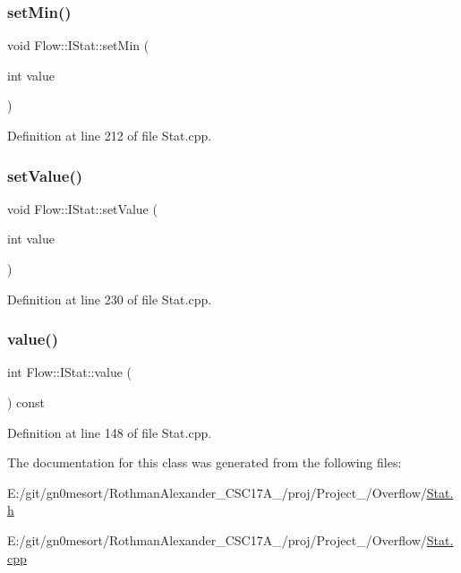 \hypertarget{class_flow_1_1_i_stat_a63acbda4a0cf88f55401e11fd79b4500}{}\label{class_flow_1_1_i_stat_a63acbda4a0cf88f55401e11fd79b4500} 
\subsubsection{\texorpdfstring{set\+Min()}{setMin()}}
{\footnotesize\ttfamily void Flow\+::\+I\+Stat\+::set\+Min (\begin{DoxyParamCaption}\item[{int}]{value }\end{DoxyParamCaption})}



Definition at line 212 of file Stat.\+cpp.

\hypertarget{class_flow_1_1_i_stat_a96644e89411ca827923e153693a2b9be}{}\label{class_flow_1_1_i_stat_a96644e89411ca827923e153693a2b9be} 
\subsubsection{\texorpdfstring{set\+Value()}{setValue()}}
{\footnotesize\ttfamily void Flow\+::\+I\+Stat\+::set\+Value (\begin{DoxyParamCaption}\item[{int}]{value }\end{DoxyParamCaption})}



Definition at line 230 of file Stat.\+cpp.

\hypertarget{class_flow_1_1_i_stat_aba43e05c007843c7085a6966842e305c}{}\label{class_flow_1_1_i_stat_aba43e05c007843c7085a6966842e305c} 
\subsubsection{\texorpdfstring{value()}{value()}}
{\footnotesize\ttfamily int Flow\+::\+I\+Stat\+::value (\begin{DoxyParamCaption}{ }\end{DoxyParamCaption}) const}



Definition at line 148 of file Stat.\+cpp.



The documentation for this class was generated from the following files\+:\begin{DoxyCompactItemize}
\item 
E\+:/git/gn0mesort/\+Rothman\+Alexander\+\_\+\+C\+S\+C17\+A\+\_/proj/\+Project\+\_/\+Overflow/\hyperlink{_stat_8h}{Stat.\+h}\item 
E\+:/git/gn0mesort/\+Rothman\+Alexander\+\_\+\+C\+S\+C17\+A\+\_/proj/\+Project\+\_/\+Overflow/\hyperlink{_stat_8cpp}{Stat.\+cpp}\end{DoxyCompactItemize}
